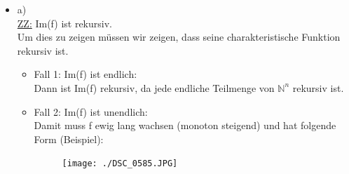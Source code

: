 \documentclass[a4paper]{scrartcl}%
\begin{document}
    \begin{itemize}
        \item a)\\
            \underline{ZZ:} Im(f) ist rekursiv.\\
            Um dies zu zeigen müssen wir zeigen, dass seine charakteristische Funktion rekursiv ist.\\
            \begin{itemize}
                \item Fall 1: Im(f) ist endlich:\\
                    Dann ist Im(f) rekursiv, da jede endliche Teilmenge von $ \mathds{N}^n$ rekursiv ist.\\
                \item Fall 2: Im(f) ist unendlich:\\
                    Damit muss f ewig lang wachsen (monoton steigend) und hat folgende Form (Beispiel):\\
                    \begin{figure}[H]
                        \centering
                        \texttt{[image: ./DSC\_0585.JPG]}
                        \label{fig:./DSC_0585}
                    \end{figure}


\end{itemize}
\end{itemize}
\end{document}
